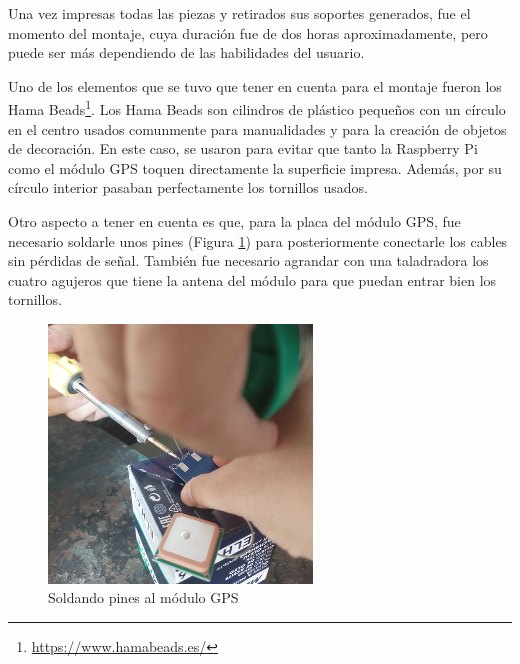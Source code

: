 Una vez impresas todas las piezas y retirados sus soportes generados, fue el momento del montaje, cuya duración fue de dos horas aproximadamente, pero puede ser más dependiendo de las habilidades del usuario.

Uno de los elementos que se tuvo que tener en cuenta para el montaje fueron los Hama Beads\footnote{\url{https://www.hamabeads.es/}}. Los Hama Beads son cilindros de plástico pequeños con un círculo en el centro usados comunmente para manualidades y para la creación de objetos de decoración. En este caso, se usaron para evitar que tanto la Raspberry Pi como el módulo GPS toquen directamente la superficie impresa. Además, por su círculo interior pasaban perfectamente los tornillos usados. 





Otro aspecto a tener en cuenta es que, para la placa del módulo GPS, fue necesario soldarle unos pines (Figura \ref{fig:soldar}) para posteriormente conectarle los cables sin pérdidas de señal. También fue necesario agrandar con una taladradora los cuatro agujeros que tiene la antena del módulo para que puedan entrar bien los tornillos. 

\begin{figure} [h!]
	\begin{center}
		\includegraphics[width=7cm]{figs/cap5/soldar.jpeg}
	\end{center}
	\caption{Soldando pines al módulo GPS} 
	\label{fig:soldar}
\end{figure}

